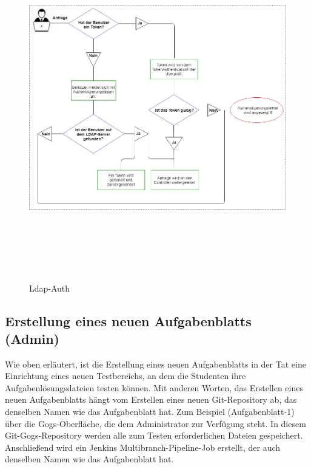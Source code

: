 \documentclass[a4paper,12pt,oneside]{book}
\begin{document}
\begin{figure}[h!]
	\begin{center}
		\includegraphics[width=15cm, height=15cm]{Ldap-Auth.jpg}
		\caption{Ldap-Auth } 
		\label{ Ldap-Auth } 
	\end{center}
\end{figure}
\newpage
\subsection{Erstellung eines neuen Aufgabenblatts (Admin)}
Wie oben erläutert, ist die Erstellung eines neuen Aufgabenblatts in der Tat eine Einrichtung eines neuen Testbereichs, an dem die Studenten ihre Aufgabenlösungsdateien testen können. Mit anderen Worten, das Erstellen eines neuen Aufgabenblatts hängt vom Erstellen eines neuen Git-Repository ab, das denselben Namen wie das Aufgabenblatt hat. Zum Beispiel (Aufgabenblatt-1) über die Gogs-Oberfläche, die dem Administrator zur Verfügung steht. In diesem Git-Gogs-Repository werden alle zum Testen erforderlichen Dateien gespeichert. Anschließend wird ein Jenkins Multibranch-Pipeline-Job erstellt, der auch denselben Namen wie das Aufgabenblatt hat.
\end{document}
